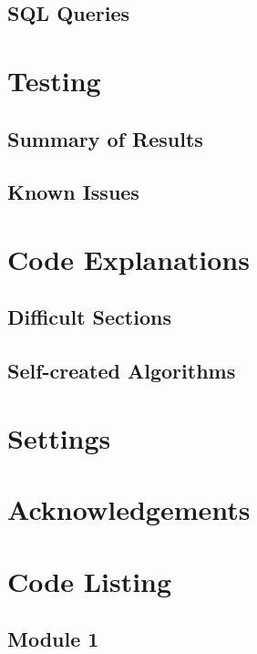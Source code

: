 \subsection{SQL Queries}

\section{Testing}

\subsection{Summary of Results}

\subsection{Known Issues}

\section{Code Explanations}

\subsection{Difficult Sections}

\subsection{Self-created Algorithms}

\section{Settings}

\section{Acknowledgements}

\section{Code Listing}
\begin{landscape}
\subsection{Module 1}
\begin{comment}
\pythonfile[firstline=5]{./tex/function_programs/print_function.py}
\end{comment}
\end{landscape}
